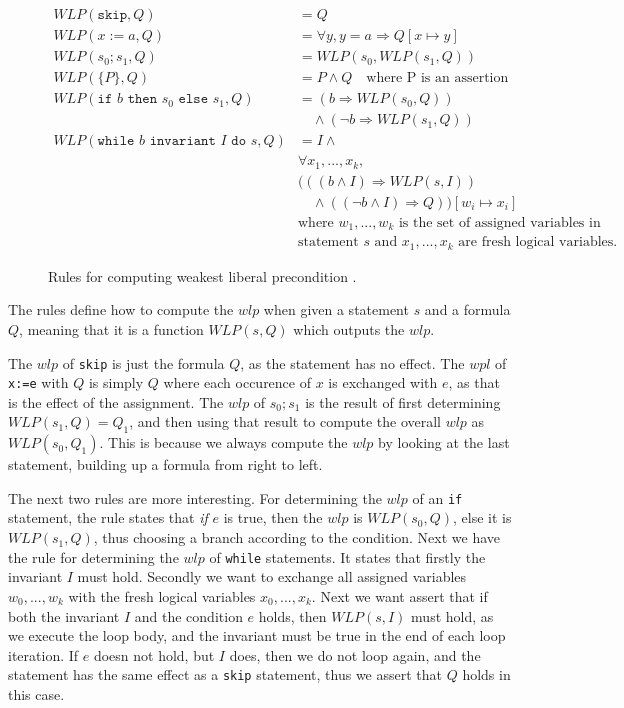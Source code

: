\begin{figure}[h!]
\begin{align*}
WLP(\texttt{skip}, Q) &= Q \\
WLP(x:=a,Q) &= \forall y, y = a \Rightarrow Q[x \mapsto y] \\
WLP(s_0;s_1, Q) &= WLP(s_0, WLP(s_1, Q)) \\
WLP(\{P\}, Q) &= P \land Q \quad \text{where P is an assertion} \\
WLP(\texttt{if } b \texttt{ then } s_0 \texttt{ else } s_1, Q) &= (b \Rightarrow WLP(s_0, Q)) \\
    &\quad \land (\neg b \Rightarrow WLP(s_1, Q)) \\
WLP(\texttt{while } b \texttt{ invariant } I \texttt{ do } s, Q) &=
    I \land \\
&\forall x_1, ..., x_k, \\
&(((b \land I) \Rightarrow WLP(s, I)) \\
&\quad \land (( \neg b \land I) \Rightarrow Q))
    [w_i \mapsto x_i] \\
&\text{where } w_1, ..., w_k \text{ is the set of assigned variables in} \\
&\text{statement } s \text{ and } x_1, ..., x_k \text{ are fresh logical variables.}
\end{align*}
\caption{Rules for computing weakest liberal precondition \cite{wlp}.}
\label{fig:wlp}
\end{figure}

The rules define how to compute the $wlp$ when given a statement $s$ and a formula $Q$, meaning that it is a function $WLP(s,Q)$ which outputs the $wlp$.

The $wlp$ of \texttt{skip} is just the formula $Q$, as the statement has no effect.
The $wpl$ of \texttt{x:=e} with $Q$ is simply $Q$ where each occurence of $x$ is exchanged with $e$, as that is the effect of the assignment.
The $wlp$ of $s_0;s_1$ is the result of first determining $WLP(s_{1},Q) = Q_{1}$, and then using that result to compute the overall $wlp$ as $WLP(s_{0}, Q_{1})$. This is because we always compute the $wlp$ by looking at the last statement, building up a formula from right to left.

The next two rules are more interesting.
For determining the $wlp$ of an \texttt{if} statement, the rule states that \textit{if} $e$ is true, then the $wlp$ is $WLP(s_{0}, Q)$, else it is $WLP(s_{1},Q)$, thus choosing a branch according to the condition.
Next we have the rule for determining the $wlp$ of \texttt{while} statements.
It states that firstly the invariant $I$ must hold. Secondly we want to exchange all assigned variables $w_{0},...,w_{k}$ with the fresh logical variables $x_{0},...,x_{k}$. Next we want assert that if both the invariant $I$ and the condition $e$ holds, then $WLP(s, I)$ must hold, as we execute the loop body, and the invariant must be true in the end of each loop iteration. If $e$ doesn not hold, but $I$ does, then we do not loop again, and the statement has the same effect as a \texttt{skip} statement, thus we assert that $Q$ holds in this case.

